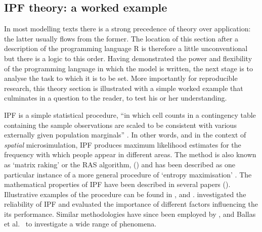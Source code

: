 \documentclass[a4paper, 11pt, twoside]{Thesis}
\begin{document}
\subsection{IPF theory: a worked example} \label{s:theory}
In most modelling texts there is a strong precedence of theory over
application: the latter usually flows from the former. The location 
of this section after a description of the programming language
R is therefore a little unconventional but there is a logic to this order. 
Having demonstrated the power and flexibility of the programming language in
which the model is written, the next stage is to analyse the task to which it
is to be set. More importantly for reproducible research, this theory section
is illustrated with a simple worked example that culminates in
a question to the reader, to test his or her understanding.

IPF is a simple statistical procedure, ``in which cell counts in a contingency
table containing the sample observations are scaled to be consistent with
various externally given population marginals'' \citep{mcfadden2006testing}. In
other words, and in the context of \emph{spatial} microsimulation, IPF produces
maximum likelihood estimates for the frequency with which people appear in
different areas. The method is also known as `matrix raking' or the RAS
algorithm, (\citealp{Birkin1988, Muller2010,
Simpson2005, Kalantari2008, Jirousek1995}) and has been described as one
particular instance of a more general procedure of `entropy maximisation'
\citep{Johnston1993, blien1998entropy}.
The mathematical properties of IPF
have been described in several papers
(\citealp{Bishop1975, Fienberg1970, Birkin1988}).
Illustrative examples of the procedure can be found in
\citet{Saito1992}, \citet{Wong1992}
and \citet{Norman1999a}. \citet{Wong1992} investigated the reliability of IPF
and evaluated the importance of different factors influencing the its
performance. Similar methodologies have since been employed by
\citet{Mitchell2000}, \citet{Williamson2002} and
Ballas et al.~\citeyearpar{Ballas2005c, Ballas2005}
to investigate a wide range of phenomena.
\end{document}
